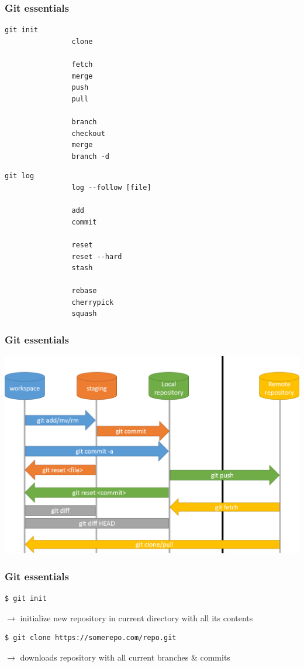 \documentclass{beamer}
\begin{document}
    \begin{frame}[fragile]
        \frametitle{Git essentials}
        \begin{multicols}{2}
        \begin{lstlisting}[gobble=12]
            git init                
                clone

                fetch
                merge
                push
                pull

                branch
                checkout
                merge
                branch -d
        \end{lstlisting}
        \begin{lstlisting}[gobble=12]
            git log                
                log --follow [file]

                add
                commit

                reset
                reset --hard
                stash

                rebase
                cherrypick
                squash
        \end{lstlisting}
        \end{multicols}
    \end{frame}
    \begin{frame}
        \frametitle{Git essentials}
        \includegraphics[width=\textwidth]{workflow.png}
    \end{frame}
    \begin{frame}[fragile]
        \frametitle{Git essentials}
        \begin{lstlisting}[gobble=12]
            $ git init
        \end{lstlisting}
        $\rightarrow$ initialize new repository in current directory with all its contents
        \begin{lstlisting}[gobble=12]
            $ git clone https://somerepo.com/repo.git
        \end{lstlisting}
        $\rightarrow$ downloads repository with all current branches \& commits
    \end{frame}
\end{document}
